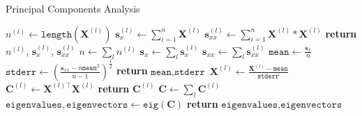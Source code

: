 \documentclass[10pt]{article}
\begin{document}

\begin{algorithm}

  \caption{Principal Components Analysis}

  \begin{algorithmic}[1] %
                \State $n^{(l)} \gets \texttt{length}(\mathbf{X}^{(l)})$ 
                \State $\mathbf{s}_x^{(l)} \gets \sum_{i = 1}^n \mathbf{X}^{(l)}$
                \State $\mathbf{s}_{xx}^{(l)} \gets \sum_{i = 1}^n \mathbf{X}^{(l)} * \mathbf{X}^{(l)}$ 
                \State \textbf{return} $n^{(l)}$, $\mathbf{s}_x^{(l)}$, $\mathbf{s}_{xx}^{(l)}$
          \EndProcedure
                  \State $n \gets \sum_l n^{(l)}$
                  \State $\mathbf{s}_x \gets \sum_l \mathbf{s}_x^{(l)}$
                  \State $\mathbf{s}_{xx} \gets \sum_l \mathbf{s}_{xx}^{(l)}$
                  \State $\texttt{mean} \gets \frac{\mathbf{s}_x}{n}$
                  \State $\texttt{stderr} \gets \left( \frac{\mathbf{s}_{xx} - n \texttt{mean}^2}{n - 1} \right)^\frac{1}{2}$
                  \State \textbf{return} $\texttt{mean}, \texttt{stderr}$
          \EndProcedure
                \State $\mathbf{X}^{(l)} \gets \frac{\mathbf{X}^{(l)} - \texttt{mean}}{\texttt{stderr}}$
                \State $\mathbf{C}^{(l)} \gets \mathbf{X}^{(l)\top} \mathbf{X}^{(l)}$
                \State \textbf{return} $\mathbf{C}^{(l)}$
        \EndProcedure
                \State $\mathbf{C} \gets \sum_l \mathbf{C}^{(l)}$
                \State $\texttt{eigenvalues}, \texttt{eigenvectors} \gets \texttt{eig}(\mathbf{C})$ 
                \State \textbf{return} $\texttt{eigenvalues}, \texttt{eigenvectors}$
        \EndProcedure
  \end{algorithmic}

\end{algorithm}
\end{document}
